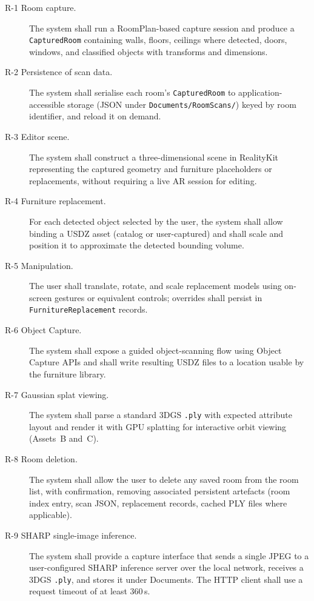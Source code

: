 \begin{description}
    \item[R-1 Room capture.] The system shall run a RoomPlan-based capture session and produce a \texttt{CapturedRoom} containing walls, floors, ceilings where detected, doors, windows, and classified objects with transforms and dimensions.

    \item[R-2 Persistence of scan data.] The system shall serialise each room's \texttt{CapturedRoom} to application-accessible storage (JSON under \texttt{Documents/RoomScans/}) keyed by room identifier, and reload it on demand.

    \item[R-3 Editor scene.] The system shall construct a three-dimensional scene in RealityKit representing the captured geometry and furniture placeholders or replacements, without requiring a live AR session for editing.

    \item[R-4 Furniture replacement.] For each detected object selected by the user, the system shall allow binding a USDZ asset (catalog or user-captured) and shall scale and position it to approximate the detected bounding volume.

    \item[R-5 Manipulation.] The user shall translate, rotate, and scale replacement models using on-screen gestures or equivalent controls; overrides shall persist in \texttt{FurnitureReplacement} records.

    \item[R-6 Object Capture.] The system shall expose a guided object-scanning flow using Object Capture APIs and shall write resulting USDZ files to a location usable by the furniture library.

    \item[R-7 Gaussian splat viewing.] The system shall parse a standard 3DGS \texttt{.ply} with expected attribute layout and render it with GPU splatting for interactive orbit viewing (Assets~B and~C).

    \item[R-8 Room deletion.] The system shall allow the user to delete any saved room from the room list, with confirmation, removing associated persistent artefacts (room index entry, scan JSON, replacement records, cached PLY files where applicable).

    \item[R-9 SHARP single-image inference.] The system shall provide a capture interface that sends a single JPEG to a user-configured SHARP inference server over the local network, receives a 3DGS \texttt{.ply}, and stores it under Documents. The HTTP client shall use a request timeout of at least 360\,s.


\end{description}
